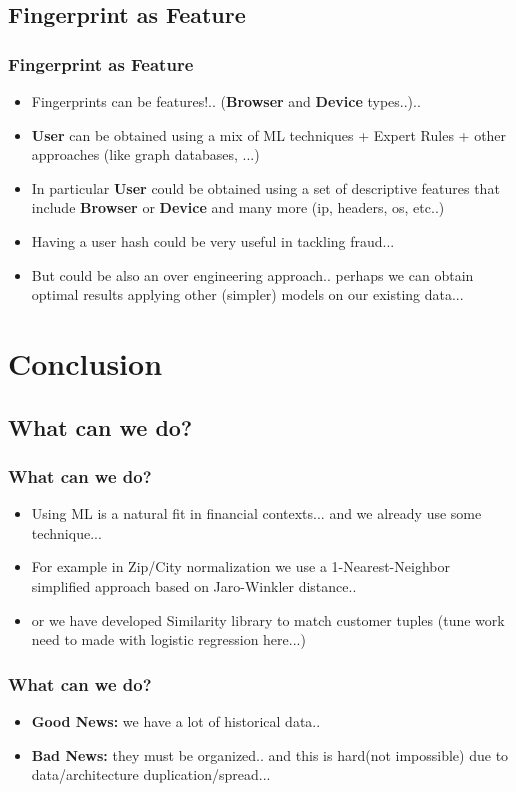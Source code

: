 \documentclass{beamer}
\begin{document}
\subsection{Fingerprint as Feature}
\begin{frame}
  \frametitle{Fingerprint as Feature}
  \begin{itemize}
	\item<+-> Fingerprints can be features!.. (\textbf{Browser} and \textbf{Device} types..)..
	\item<+-> \textbf{User} can be obtained using a mix of ML techniques + Expert Rules + other approaches (like graph databases, ...)
	\item<+-> In particular \textbf{User} could be obtained using a set of descriptive features that include \textbf{Browser} or \textbf{Device} and many more (ip, headers, os, etc..)
	\item<+-> Having a user hash could be very useful in tackling fraud...
	\item<+-> But could be also an over engineering approach.. perhaps we can obtain optimal results applying other (simpler) models on our existing data...
   \end{itemize}
\end{frame}


\section{Conclusion}
\subsection{What can we do?}
\begin{frame}
  \frametitle{What can we do?}
  \begin{itemize}
	\item<+-> Using ML is a natural fit in financial contexts... and we already use some technique...
	\item<+-> For example in Zip/City normalization we use a 1-Nearest-Neighbor simplified approach based on Jaro-Winkler distance..
	\item<+-> or we have developed Similarity library to match customer tuples (tune work need to made with logistic regression here...) 
   \end{itemize}
\end{frame}

\begin{frame}
  \frametitle{What can we do?}
  \begin{itemize}
	\item<+-> \textbf{Good News:} we have a lot of historical data..
	\item<+-> \textbf{Bad News:} they must be organized.. and this is hard(not impossible) due to data/architecture duplication/spread...
   \end{itemize}
\end{frame}
\end{document}
